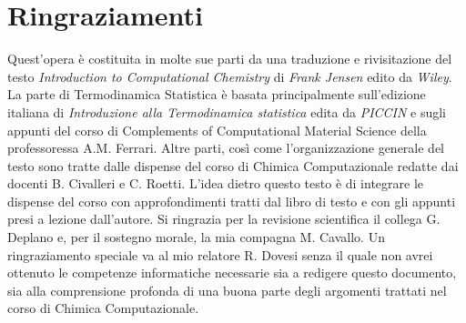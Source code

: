 \documentclass[oneside]{amsbook}
\numberwithin{section}{chapter}
\numberwithin{equation}{section}
\numberwithin{figure}{section}
\begin{document}
\chapter*{Ringraziamenti}
Quest'opera è costituita in molte sue parti da una traduzione e rivisitazione del testo \emph{Introduction to Computational Chemistry} di \emph{Frank Jensen} edito da \emph{Wiley}. La parte di Termodinamica Statistica è basata principalmente sull'edizione italiana di \emph{Introduzione alla Termodinamica statistica} edita da \emph{PICCIN} e sugli appunti del corso di Complements of Computational Material Science della professoressa A.M. Ferrari. Altre parti, così come l'organizzazione generale del testo sono tratte dalle dispense del corso di Chimica Computazionale redatte dai docenti B. Civalleri e C. Roetti. L'idea dietro questo testo è di integrare le dispense del corso con approfondimenti tratti dal libro di testo e con gli appunti presi a lezione dall'autore. Si ringrazia per la revisione scientifica il collega G. Deplano e, per il sostegno morale, la mia compagna M. Cavallo.
Un ringraziamento speciale va al mio relatore R. Dovesi senza il quale non avrei ottenuto le competenze informatiche necessarie sia a redigere questo documento, sia alla comprensione profonda di una buona parte degli argomenti trattati nel corso di Chimica Computazionale.
\newpage
\end{document}
